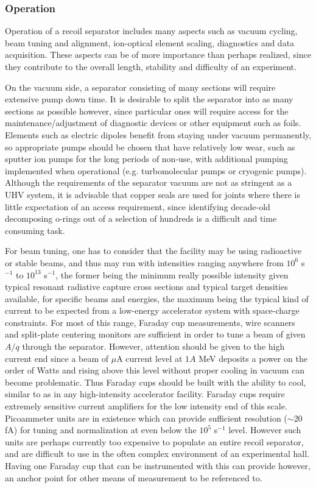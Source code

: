 \subsubsection{Operation}

Operation of a recoil separator includes many aspects such as vacuum cycling, beam tuning and alignment, ion-optical element scaling, diagnostics and data acquisition. These aspects can be of more importance than perhaps realized, since they contribute to the overall length, stability and difficulty of an experiment. 

On the vacuum side, a separator consisting of many sections will require extensive pump down time. It is desirable to split the separator into as many sections as possible however, since particular ones will require access for the maintenance/adjustment of diagnostic devices or other equipment such as foils. Elements such as electric dipoles benefit from staying under vacuum permanently, so appropriate pumps should be chosen that have relatively low wear, such as sputter ion pumps for the long periods of non-use, with additional pumping implemented when operational (e.g. turbomolecular pumps or cryogenic pumps). Although the requirements of the separator vacuum are not as stringent as a UHV system, it is advisable that copper seals are used for joints where there is little expectation of an access requirement, since identifying decade-old decomposing o-rings out of a selection of hundreds is a difficult and time consuming task.

For beam tuning, one has to consider that the facility may be using radioactive or stable beams, and thus may run with intensities ranging anywhere from $10^{6}$ s$^{-1}$ to $10^{13}$ s$^{-1}$, the former being the minimum really possible intensity given typical resonant radiative capture cross sections and typical target densities available, for specific beams and energies, the maximum being the typical kind of current to be expected from a low-energy accelerator system with space-charge constraints. For most of this range, Faraday cup measurements, wire scanners and split-plate centering monitors are sufficient in order to tune a beam of given $A/q$ through the separator. However, attention should be given to the high current end since a beam of $\mu$A current level at $1A$ MeV deposits a power on the order of Watts and rising above this level without proper cooling in vacuum can become problematic. Thus Faraday cups should be built with the ability to cool, similar to as in any high-intensity accelerator facility. Faraday cups require extremely sensitive current amplifiers for the low intensity end of this scale. Picoammeter units are in existence which can provide sufficient resolution ($\sim$20 fA) for tuning and normalization at even below the $10^{5}$ s$^{-1}$ level. However such units are perhaps currently too expensive to populate an entire recoil separator, and are difficult to use in the often complex environment of an experimental hall. Having one Faraday cup that can be instrumented with this can provide however, an anchor point for other means of measurement to be referenced to. 

